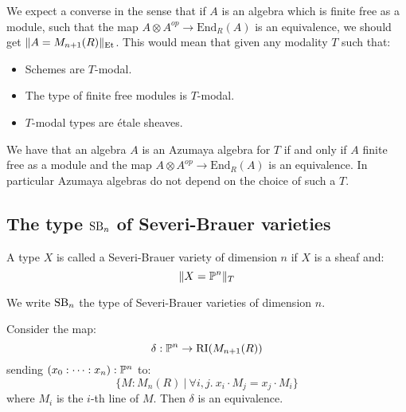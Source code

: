 \begin{remark}\label{azumaya-independent-modality}
We expect a converse in the sense that if $A$ is an algebra which is finite free as a module, such that the map $A\otimes A^{op} \to \mathrm{End}_R(A)$ is an equivalence, we should get $\lVert A=M_{n+1}(R) \rVert_{\mathrm{Et}}$. This would mean that given any modality $T$ such that:
\begin{itemize}
\item Schemes are $T$-modal.
\item The type of finite free modules is $T$-modal.
\item $T$-modal types are étale sheaves.
\end{itemize}
We have that an algebra $A$ is an Azumaya algebra for $T$ if and only if $A$ finite free as a module and the map $A\otimes A^{op} \to \mathrm{End}_R(A)$ is an equivalence. In particular Azumaya algebras do not depend on the choice of such a $T$.
\end{remark}


\subsection{The type $\mathrm{SB}_n$ of Severi-Brauer varieties}

\begin{definition}
A type $X$ is called a Severi-Brauer variety of dimension $n$ if $X$ is a sheaf and:
\[\lVert X=\mathbb{P}^n \rVert_T\]
\end{definition}

We write $\mathrm{SB}_n$ the type of Severi-Brauer varieties of dimension $n$.

\begin{lemma}\label{right-ideal-of-matrices-are-projective}
Consider the map:
\[\delta:\mathbb{P}^n \to \mathrm{RI}(M_{n+1}(R))\]
sending $(x_0:\cdots:x_n):\mathbb{P}^n$ to:
\[\{M:M_n(R)\ |\ \forall i,j.\ x_i\cdot M_j = x_j\cdot M_i\}\]
where $M_i$ is the $i$-th line of $M$. Then $\delta$ is an equivalence.
\end{lemma}

